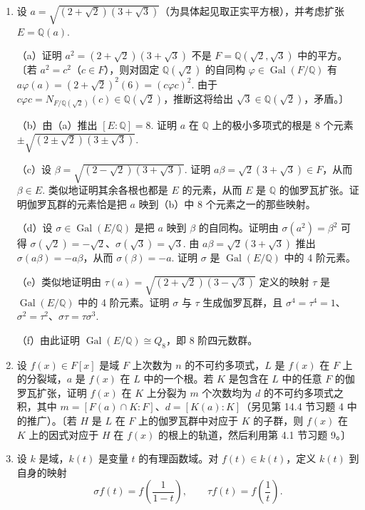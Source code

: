 \begin{enumerate}
\item 设 \(a = \sqrt{(2+\sqrt{2})(3+\sqrt{3})}\)（为具体起见取正实平方根），并考虑扩张 \(E = \mathbb{Q}(a)\).

（a）证明 \(a^2 = (2+\sqrt{2})(3+\sqrt{3})\) 不是 \(F = \mathbb{Q}(\sqrt{2}, \sqrt{3})\) 中的平方。〔若 \(a^2 = c^2\)（\(c \in F\)），则对固定 \(\mathbb{Q}(\sqrt{2})\) 的自同构 \(\varphi \in \operatorname{Gal}(F/\mathbb{Q})\) 有 \(a\varphi(a) = (2+\sqrt{2})^2(6) = (c\varphi c)^2\). 由于 \(c\varphi c = N_{F/\mathbb{Q}(\sqrt{2})}(c) \in \mathbb{Q}(\sqrt{2})\)，推断这将给出 \(\sqrt{3} \in \mathbb{Q}(\sqrt{2})\)，矛盾。〕

（b）由（a）推出 \([E:\mathbb{Q}] = 8\). 证明 \(a\) 在 \(\mathbb{Q}\) 上的极小多项式的根是 8 个元素 \(\pm\sqrt{(2\pm\sqrt{2})(3\pm\sqrt{3})}\).

（c）设 \(\beta = \sqrt{(2-\sqrt{2})(3+\sqrt{3})}\). 证明 \(a\beta = \sqrt{2}(3+\sqrt{3}) \in F\)，从而 \(\beta \in E\). 类似地证明其余各根也都是 \(E\) 的元素，从而 \(E\) 是 \(\mathbb{Q}\) 的伽罗瓦扩张。证明伽罗瓦群的元素恰是把 \(a\) 映到（b）中 8 个元素之一的那些映射。

（d）设 \(\sigma \in \operatorname{Gal}(E/\mathbb{Q})\) 是把 \(a\) 映到 \(\beta\) 的自同构。证明由 \(\sigma(a^2) = \beta^2\) 可得 \(\sigma(\sqrt{2}) = -\sqrt{2}\)、\(\sigma(\sqrt{3}) = \sqrt{3}\). 由 \(a\beta = \sqrt{2}(3+\sqrt{3})\) 推出 \(\sigma(a\beta) = -a\beta\)，从而 \(\sigma(\beta) = -a\). 证明 \(\sigma\) 是 \(\operatorname{Gal}(E/\mathbb{Q})\) 中的 4 阶元素。

（e）类似地证明由 \(\tau(a) = \sqrt{(2+\sqrt{2})(3-\sqrt{3})}\) 定义的映射 \(\tau\) 是 \(\operatorname{Gal}(E/\mathbb{Q})\) 中的 4 阶元素。证明 \(\sigma\) 与 \(\tau\) 生成伽罗瓦群，且 \(\sigma^4 = \tau^4 = 1\)、\(\sigma^2 = \tau^2\)、\(\sigma\tau = \tau\sigma^3\).

（f）由此证明 \(\operatorname{Gal}(E/\mathbb{Q}) \cong Q_8\)，即 8 阶四元数群。

\item 设 \(f(x) \in F[x]\) 是域 \(F\) 上次数为 \(n\) 的不可约多项式，\(L\) 是 \(f(x)\) 在 \(F\) 上的分裂域，\(a\) 是 \(f(x)\) 在 \(L\) 中的一个根。若 \(K\) 是包含在 \(L\) 中的任意 \(F\) 的伽罗瓦扩张，证明 \(f(x)\) 在 \(K\) 上分裂为 \(m\) 个次数均为 \(d\) 的不可约多项式之积，其中 \(m = [F(a) \cap K:F]\)、\(d = [K(a):K]\)（另见第 14.4 节习题 4 中的推广）。〔若 \(H\) 是 \(L\) 在 \(F\) 上的伽罗瓦群中对应于 \(K\) 的子群，则 \(f(x)\) 在 \(K\) 上的因式对应于 \(H\) 在 \(f(x)\) 的根上的轨道，然后利用第 4.1 节习题 9。〕

\item 设 \(k\) 是域，\(k(t)\) 是变量 \(t\) 的有理函数域。对 \(f(t) \in k(t)\)，定义 \(k(t)\) 到自身的映射
\[
\sigma f(t) = f\left(\frac{1}{1-t}\right), \qquad \tau f(t) = f\left(\frac{1}{t}\right).
\]


\end{enumerate}
